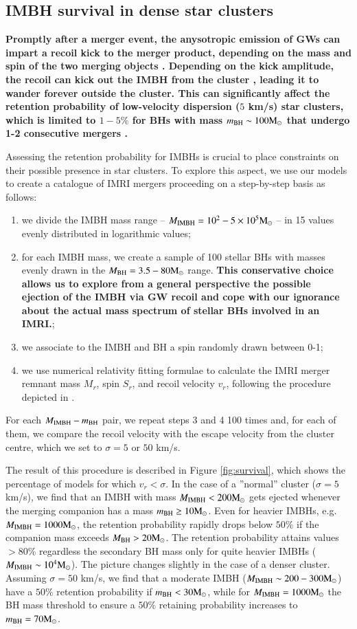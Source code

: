 \documentclass[article]{aa}
\newcommand{\Ms}{{\rm M}_\odot}
\newcommand{\ibh}{{\rm IMBH}}
\newcommand{\bh}{{\rm BH}}
\begin{document}
\subsection{IMBH survival in dense star clusters}
{\bf
Promptly after a merger event, the anysotropic emission of GWs can impart a recoil kick to the merger product, depending on the mass and spin of the two merging objects \citep{campanelli07,gonzalez07,lousto08,lousto12}. Depending on the kick amplitude, the recoil can kick out the IMBH from the cluster \citep[e.g.][]{bockelmann08,fragione17c}, leading it to wander forever outside the cluster. 
This can significantly affect the retention probability of low-velocity dispersion ($5$ km/s) star clusters, which is limited to $1-5\%$ for BHs with mass $m_\bh \sim 100 \Ms$ that undergo 1-2 consecutive mergers \citep{arca20}. 

Assessing the retention probability for IMBHs is crucial to place constraints on their possible presence in star clusters. To explore this aspect, we use our models to create a catalogue of IMRI mergers proceeding on a step-by-step basis as follows: 
\begin{enumerate}
\item we divide the IMBH mass range -- $M_\ibh = 10^2-5\times 10^5\Ms$ -- in 15 values evenly distributed in logarithmic values;
\item for each IMBH mass, we create a sample of 100 stellar BHs with masses evenly drawn in the $M_\bh = 3.5-80 \Ms$ range. {\bf This conservative choice allows us to explore from a general perspective the possible ejection of the IMBH via GW recoil and cope with our ignorance about the actual mass spectrum of stellar BHs involved in an IMRI.};
\item we associate to the IMBH and BH a spin randomly drawn between 0-1;
\item we use \cite{jimenez17} numerical relativity fitting formulae to calculate the IMRI merger remnant mass $M_r$, spin $S_r$, and recoil velocity $v_r$, following the procedure depicted in \cite{arca20}.
\end{enumerate}
For each $M_\ibh -m_\bh$ pair, we repeat steps 3 and 4 100 times and, for each of them, we compare the recoil velocity with the escape velocity from the cluster centre, which we set to $\sigma = 5$ or $50$ km/s. 

The result of this procedure is described in Figure \ref{fig:survival}, which shows the percentage of models for which $v_r < \sigma$. In the case of 
a ''normal'' cluster ($\sigma = 5$ km/s), we find that an IMBH with mass $M_\ibh < 200 \Ms$ gets ejected whenever the merging companion has a mass $m_\bh \geq 10 \Ms$. Even for heavier IMBHs, e.g. $M_\ibh = 1000\Ms$, the retention probability rapidly drops below $50\%$  if the companion mass exceeds $M_\bh > 20\Ms$. The retention probability attains values $>80\%$ regardless the secondary BH mass only for quite heavier IMBHs ($M_\ibh \sim 10^4\Ms$). The picture changes slightly in the case of a denser cluster. Assuming $\sigma=50$ km/s, we find that a moderate IMBH ($M_\ibh \sim 200-300 \Ms$) have a $50\%$ retention probability if $m_\bh < 30\Ms$, while for $M_\ibh = 1000\Ms$ the BH mass threshold to ensure a $50\%$ retaining probability increases to $m_\bh = 70\Ms$.

}
\end{document}
